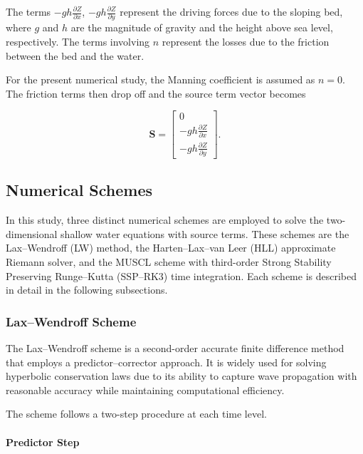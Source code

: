 \documentclass[12pt]{article}
\begin{document}
The terms $-gh\frac{\partial Z}{\partial x}$, $-gh\frac{\partial Z}{\partial y}$ represent the driving forces due to the sloping bed, where $g$ and $h$ are the magnitude of gravity and the height above sea level, respectively.
The terms involving $n$ represent the losses due to the friction between the bed and the water.

For the present numerical study, the Manning coefficient is assumed as $n=0$. The friction terms then drop off and the source term vector becomes

\begin{equation}
\mathbf{S}=
\begin{bmatrix}
0 \\
-gh\displaystyle\frac{\partial Z}{\partial x} \\
-gh\displaystyle\frac{\partial Z}{\partial y}
\end{bmatrix}.
\label{eq:simplifiedsource}
\end{equation}

\subsection{Numerical Schemes}

In this study, three distinct numerical schemes are employed to solve the two-dimensional shallow water equations with source terms. These schemes are the Lax--Wendroff (LW) method, the Harten--Lax--van Leer (HLL) approximate Riemann solver, and the MUSCL scheme with third-order Strong Stability Preserving Runge--Kutta (SSP--RK3) time integration. Each scheme is described in detail in the following subsections.

\subsubsection{Lax--Wendroff Scheme}

The Lax--Wendroff scheme is a second-order accurate finite difference method that employs a predictor--corrector approach. It is widely used for solving hyperbolic conservation laws due to its ability to capture wave propagation with reasonable accuracy while maintaining computational efficiency.

The scheme follows a two-step procedure at each time level.

\paragraph{Predictor Step}
\end{document}
